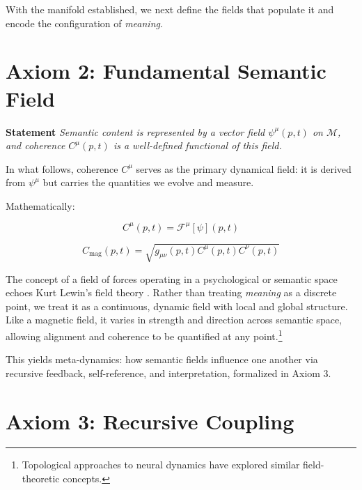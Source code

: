 With the manifold established, we next define the fields that populate it and encode the configuration of \textit{meaning}.


\section{Axiom 2: Fundamental Semantic Field}
\label{1.2:axiom_2_fundamental_semantic_field}

\textbf{Statement} \textit{Semantic content is represented by a vector field \(\psi^\mu(p,t)\) on \(\mathcal{M}\), and coherence \(C^\mu(p,t)\) is a well-defined functional of this field.}

In what follows, coherence \(C^\mu\) serves as the primary dynamical field: it is derived from \(\psi^\mu\) but carries the quantities we evolve and measure.

Mathematically:

\begin{equation}
C^\mu(p,t) = \mathcal{F}^\mu[\psi](p,t)
\end{equation}

\begin{equation}
C_{\text{mag}}(p,t) = \sqrt{g_{\mu\nu}(p,t) C^\mu(p,t) C^\nu(p,t)}
\end{equation}

The concept of a field of forces operating in a psychological or semantic space echoes Kurt Lewin's field theory \autocite{Lewin1951}. Rather than treating \textit{meaning} as a discrete point, we treat it as a continuous, dynamic field with local and global structure. Like a magnetic field, it varies in strength and direction across semantic space, allowing alignment and coherence to be quantified at any point.\footnote{Topological approaches to neural dynamics \autocite{Bassett2018, Petri2014} have explored similar field-theoretic concepts.}

This yields meta-dynamics: how semantic fields influence one another via recursive feedback, self-reference, and interpretation, formalized in Axiom 3.


\section{Axiom 3: Recursive Coupling}
\label{1.3:axiom_3_recursive_coupling}

